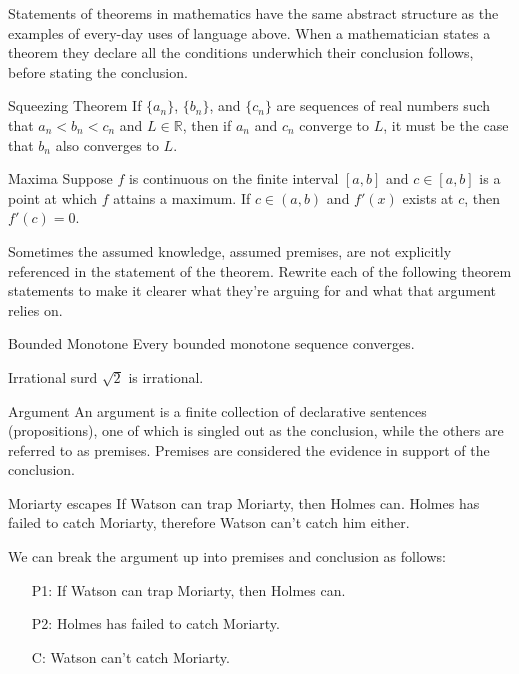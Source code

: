 \documentclass{book}
\begin{document}
Statements of theorems in mathematics have the same abstract structure as the examples of every-day uses of language above. When a mathematician states a theorem they declare all the conditions underwhich their conclusion follows, before stating the conclusion. 

\begin{eg}{Squeezing Theorem}
    If $\{a_{n}\}$, $\{b_{n}\}$, and $\{c_{n}\}$ are sequences of real numbers such that $a_{n} < b_{n} < c_{n}$ and $L \in \mathbb{R}$, then if $a_{n}$ and $c_{n}$ converge to $L$, it must be the case that $b_{n}$ also converges to $L$. 
\end{eg}

\begin{eg}{Maxima}
Suppose $f$ is continuous on the finite interval $[a,b]$ and $c \in [a,b]$ is a point at which $f$ attains a maximum. If $c \in (a,b)$ and $f'(x)$ exists at $c$, then $f'(c) = 0$. 
\end{eg}

Sometimes the assumed knowledge, assumed premises, are not explicitly referenced in the statement of the theorem. Rewrite each of the following theorem statements to make it clearer what they're arguing for and what that argument relies on. 

\begin{eg}{Bounded Monotone}
    Every bounded monotone sequence converges.
\end{eg}

\begin{eg}{Irrational surd}
    $\sqrt{2}$ is irrational.
\end{eg}



\begin{definition}{Argument}
    An argument is a finite collection of declarative sentences (propositions), one of which is singled out as the conclusion, while the others are referred to as premises. Premises are considered the evidence in support of the conclusion.
\end{definition}

\begin{eg}{Moriarty escapes}
    If Watson can trap Moriarty, then Holmes can. Holmes has failed to catch Moriarty, therefore Watson can't catch him either. 

    We can break the argument up into premises and conclusion as follows: 

    \begin{itemize}
        \item[P1:] If Watson can trap Moriarty, then Holmes can.
        \item[P2:] Holmes has failed to catch Moriarty.
        \item[C:] Watson can't catch Moriarty. 
    \end{itemize}
\end{eg}
\end{document}
